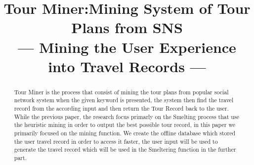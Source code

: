 \documentclass[conference]{IEEEtran}
\begin{document}
\title{Tour Miner:Mining System of Tour Plans from SNS\\
{\huge  --- Mining the User Experience into Travel Records ---}
}

\author{
\and
{}
\and
}

\maketitle

\begin{abstract}
Tour Miner is the process that consist of mining the tour plans from popular social network system when the given keyword is presented, the system then find the travel record from the according input and then return the Tour Record back to the user. 
While the previous paper, the research focus primarly on the Smelting process that use the heuristic mining in order to output the best possible tour record, in this paper we primarily focused on the mining function. We create the offline database which stored the user travel record in order to access it faster, the user input will be used to generate the travel record which will be used in the Smeltering function in the further part.
\end{abstract}
\end{document}
